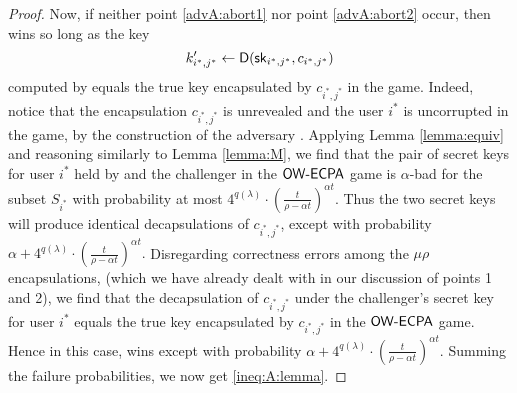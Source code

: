 \begin{proof}
  Now, if neither point \ref{advA:abort1} nor point \ref{advA:abort2} occur,
  then \advA wins so long as the key
  \[
  k_{i^{*},j^{*}}' \leftarrow \mathsf{D}(\mathsf{sk}_{i^{*},j^{*}}, c_{i^{*},j^{*}})
  \]
  computed by \advA equals the true key encapsulated by \(c_{i^{*},j^{*}}\) in the game.
  Indeed, notice that the encapsulation \(c_{i^{*},j^{*}}\) is unrevealed
  and the user \(i^{*}\) is uncorrupted in the \OWECPA game,
  by the construction of the adversary \advA.
  Applying Lemma \ref{lemma:equiv}
  and reasoning similarly to Lemma \ref{lemma:M},
  we find that the pair of secret keys for user \(i^{*}\) held by \advA
  and the challenger in the \(\mathsf{OW}\text{-}\mathsf{ECPA}\) game is
  \(\alpha\)-bad for the subset \(S_{i^{*}}\) with probability at most
  \(
    4^{q(\lambda)} \cdot \left( \frac{t}{\rho - \alpha t} \right)^{\alpha t}.
  \)
  Thus the two secret keys will produce identical decapsulations of \(c_{i^{*},j^{*}}\), except with probability
  \(
    \alpha +
    4^{q(\lambda)} \cdot \left( \frac{t}{\rho - \alpha t} \right)^{\alpha t}.
  \)
  Disregarding correctness errors among the \(\mu \rho\) encapsulations,
  (which we have already dealt with in our discussion of points 1 and 2),
  we find that the decapsulation of \(c_{i^{*},j^{*}}\)
  under the challenger's secret key for user \(i^{*}\)
  equals the true key encapsulated by \(c_{i^{*},j^{*}}\) in the \(\mathsf{OW}\text{-}\mathsf{ECPA}\) game.
  Hence in this case, \advA wins except with probability
  \(
  \alpha
  + 4^{q(\lambda)} \cdot \left( \frac{t}{\rho - \alpha t} \right)^{\alpha t}.
  \)
  Summing the failure probabilities, we now get \eqref{ineq:A:lemma}.
\end{proof}


